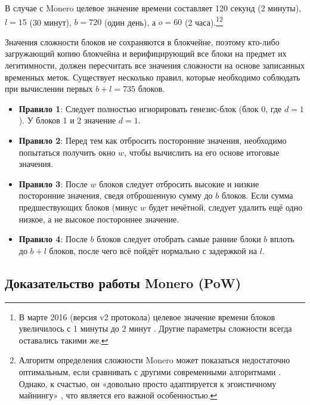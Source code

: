В случае с Monero целевое значение времени составляет 120 секунд (2 минуты), $l = 15$ (30 минут), $b = 720$ (один день), а $o = 60$ (2 часа).\footnote{В марте 2016 (версия v2 протокола) целевое значение времени блоков увеличилось с 1 минуты до 2 минут \cite{monero-0.9.3}. Другие параметры сложности всегда оставались такими же.}\footnote{Алгоритм определения сложности Monero может показаться недостаточно оптимальным, если сравнивать с другими современными алгоритмами \cite{difficuly-algorithm-summary}. Однако, к счастью, он «довольно просто адаптируется к эгоистичному майнингу» \cite{selfish-miner-profitability-algorithm-analysis}, что является его важной особенностью.}

Значения сложности блоков не сохраняются в блокчейне, поэтому кто-либо загружающий копию блокчейна и верифицирующий все блоки на предмет их легитимности, должен пересчи\-тать все значения сложности на основе записанных временных меток. Существует несколько правил, которые необходимо соблюдать при вычислении первых $b+l = 735$ блоков.

\begin{itemize}
    \item[] \textbf{Правило 1}: Следует полностью игнорировать генезис-блок (блок 0, где $d = 1$). У блоков 1 и 2 значение $d = 1$.
    \item[] \textbf{Правило 2}: Перед тем как отбросить посторонние значения, необходимо попытаться получить окно $w$, чтобы вычислить на его основе итоговые значения.
    \item[] \textbf{Правило 3}: После $w$ блоков следует отбросить высокие и низкие посторонние значения, сведя отброшенную сумму до $b$ блоков. Если сумма предшествующих блоков (минус $w$ будет нечётной, следует удалить ещё одно низкое, а не высокое постороннее значение.
    \item[] \textbf{Правило 4}: После $b$ блоков следует отобрать самые ранние блоки $b$ вплоть до $b+l$ блоков, после чего всё пойдёт нормально с задержкой на $l$.
\end{itemize}


\subsection*{Доказательство работы Monero (PoW)}

